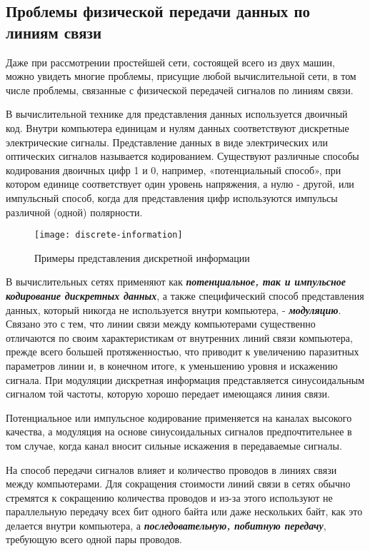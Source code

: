 \subsection{Проблемы физической передачи данных по линиям связи}

Даже при рассмотрении простейшей сети, состоящей всего из двух машин, можно увидеть многие проблемы, присущие любой вычислительной сети, в том числе проблемы, связанные с физической передачей сигналов по линиям связи.

В вычислительной технике для представления данных используется двоичный код.
Внутри компьютера единицам и нулям данных соответствуют дискретные электрические сигналы.
Представление данных в виде электрических или оптических сигналов называется кодированием.
Существуют различные способы кодирования двоичных цифр 1 и 0, например, «потенциальный способ», при котором единице соответствует один уровень напряжения, а нулю - другой, или импульсный способ, когда для представления цифр используются импульсы различной (одной) полярности.

\begin{figure}[!ht]
    \centering
    \texttt{[image: discrete-information]}
    \caption{Примеры представления дискретной информации}
    \label{fig:discrete-information}
\end{figure}

В вычислительных сетях применяют как \textbf{\textit{потенциальное, так и импульсное кодирование дискретных данных}}, а также специфический способ представления данных, который никогда не используется внутри компьютера, - \textbf{\textit{модуляцию}}.
Связано это с тем, что линии связи между компьютерами существенно отличаются по своим характеристикам от внутренних линий связи компьютера, прежде всего большей протяженностью, что приводит к увеличению паразитных параметров линии и, в конечном итоге, к уменьшению уровня и искажению сигнала.
При модуляции дискретная информация представляется синусоидальным сигналом той частоты, которую хорошо передает имеющаяся линия связи.

Потенциальное или импульсное кодирование применяется на каналах высокого качества, а модуляция на основе синусоидальных сигналов предпочтительнее в том случае, когда канал вносит сильные искажения в передаваемые сигналы.

На способ передачи сигналов влияет и количество проводов в линиях связи между компьютерами.
Для сокращения стоимости линий связи в сетях обычно стремятся к сокращению количества проводов и из-за этого используют не параллельную передачу всех бит одного байта или даже нескольких байт, как это делается внутри компьютера, а \textbf{\textit{последовательную, побитную передачу}}, требующую всего одной пары проводов.

